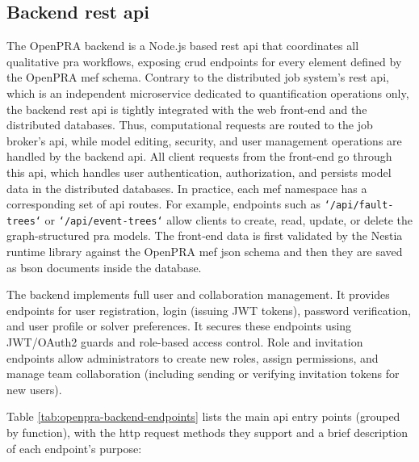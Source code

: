\subsection{Backend \acrshort{rest} \acrshort{api}}

The OpenPRA backend is a Node.js based \acrshort{rest} \acrshort{api} that coordinates all qualitative \acrshort{pra} workflows, exposing \acrfull{crud} endpoints for every element defined by the OpenPRA \acrfull{mef} schema. Contrary to the distributed job system's \acrshort{rest} \acrshort{api}, which is an independent microservice dedicated to quantification operations only, the backend \acrshort{rest} \acrshort{api} is tightly integrated with the web front‑end and the distributed databases. Thus, computational requests are routed to the job broker’s \acrshort{api}, while model editing, security, and user management operations are handled by the backend \acrshort{api}. All client requests from the front-end go through this \acrshort{api}, which handles user authentication, authorization, and persists model data in the distributed databases. In practice, each \acrshort{mef} namespace has a corresponding set of \acrshort{api} routes. For example, endpoints such as \texttt{`/api/fault-trees`} or \texttt{`/api/event-trees`} allow clients to create, read, update, or delete the graph-structured \acrshort{pra} models.  The front‑end data is first validated by the Nestia runtime library against the OpenPRA \acrshort{mef} \acrshort{json} schema and then they are saved as \acrfull{bson} documents inside the database.

The backend implements full user and collaboration management.  It provides endpoints for user registration, login (issuing JWT tokens), password verification, and user profile or solver preferences.  It secures these endpoints using JWT/OAuth2 guards and role-based access control. Role and invitation endpoints allow administrators to create new roles, assign permissions, and manage team collaboration (including sending or verifying invitation tokens for new users).  

Table \ref{tab:openpra-backend-endpoints} lists the main \acrshort{api} entry points (grouped by function), with the \acrshort{http} request methods they support and a brief description of each endpoint’s purpose:



